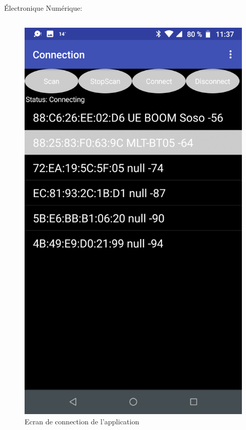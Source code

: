 \documentclass{beamer}
\begin{document}
\begin{frame}{Électronique Numérique:}
\begin{columns}[T]
\begin{column}{0.5\textwidth}
\begin{figure}
	    			\hspace*{2em}\includegraphics[height=0.8\textheight]{../Illus/AppConnection.png}
	    			\caption{Ecran de connection de l'application}
	    		\end{figure}
	  		\end{column}
		\end{columns}
		
	\end{frame}
\end{document}
